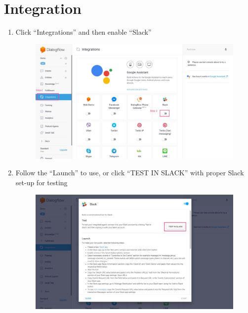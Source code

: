 \section{Integration} %
\label{sec:integration}
	\begin{enumerate}
		\item Click “Integrations” and then enable “Slack”
		\nopagebreak
		\begin{figure}[H]
			\centering
			\includegraphics[width=\linewidth, frame]{img/manual_16.jpg}
		\end{figure}

		\item Follow the “Launch” to use, or click “TEST IN SLACK” with proper Slack set-up for testing

		\begin{figure}[H]
			\centering
			\includegraphics[width=\linewidth, frame]{img/manual_17.jpg}
		\end{figure}
	\end{enumerate}


